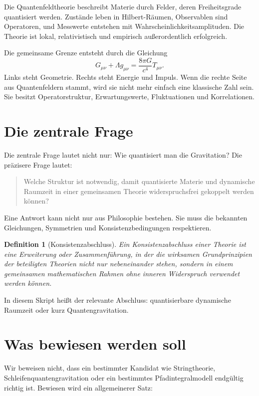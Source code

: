 \documentclass[11pt,a4paper]{book}
\newtheorem{definition}{Definition}[chapter]
\theoremstyle{remark}
\begin{document}
Die Quantenfeldtheorie beschreibt Materie durch Felder, deren Freiheitsgrade quantisiert werden. Zustände leben in Hilbert-Räumen, Observablen sind Operatoren, und Messwerte entstehen mit Wahrscheinlichkeitsamplituden. Die Theorie ist lokal, relativistisch und empirisch außerordentlich erfolgreich.

Die gemeinsame Grenze entsteht durch die Gleichung
\begin{equation}
G_{\mu\nu} + \Lambda g_{\mu\nu} = \frac{8\pi G}{c^4}T_{\mu\nu}.
\end{equation}
Links steht Geometrie. Rechts steht Energie und Impuls. Wenn die rechte Seite aus Quantenfeldern stammt, wird sie nicht mehr einfach eine klassische Zahl sein. Sie besitzt Operatorstruktur, Erwartungswerte, Fluktuationen und Korrelationen.

\section{Die zentrale Frage}
Die zentrale Frage lautet nicht nur: Wie quantisiert man die Gravitation? Die präzisere Frage lautet:

\begin{quote}
Welche Struktur ist notwendig, damit quantisierte Materie und dynamische Raumzeit in einer gemeinsamen Theorie widerspruchsfrei gekoppelt werden können?
\end{quote}

Eine Antwort kann nicht nur aus Philosophie bestehen. Sie muss die bekannten Gleichungen, Symmetrien und Konsistenzbedingungen respektieren.

\begin{definition}[Konsistenzabschluss]
Ein Konsistenzabschluss einer Theorie ist eine Erweiterung oder Zusammenführung, in der die wirksamen Grundprinzipien der beteiligten Theorien nicht nur nebeneinander stehen, sondern in einem gemeinsamen mathematischen Rahmen ohne inneren Widerspruch verwendet werden können.
\end{definition}

In diesem Skript heißt der relevante Abschluss: quantisierbare dynamische Raumzeit oder kurz Quantengravitation.

\section{Was bewiesen werden soll}
Wir beweisen nicht, dass ein bestimmter Kandidat wie Stringtheorie, Schleifenquantengravitation oder ein bestimmtes Pfadintegralmodell endgültig richtig ist. Bewiesen wird ein allgemeinerer Satz:
\end{document}
